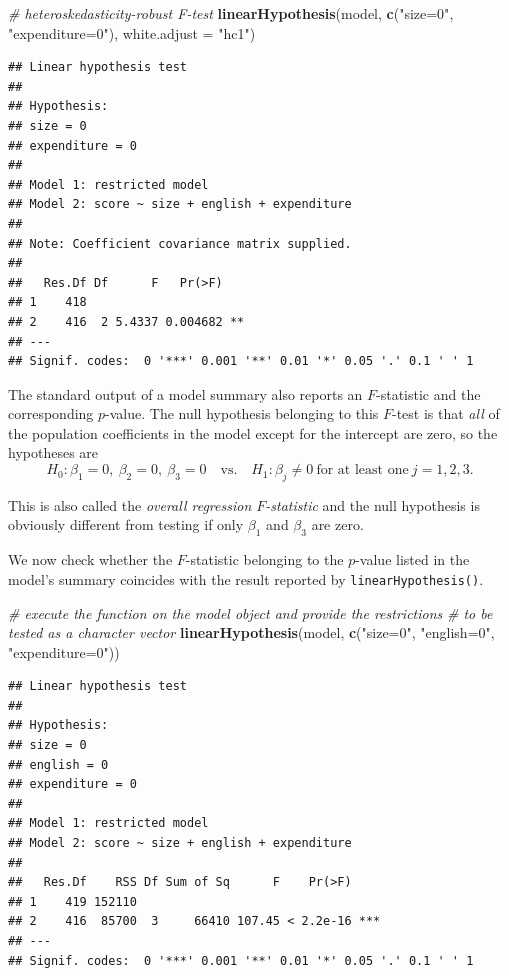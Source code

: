 \documentclass[]{book}
\newenvironment{Shaded}{\begin{snugshade}}{\end{snugshade}}
\newcommand{\KeywordTok}[1]{\textcolor[rgb]{0.13,0.29,0.53}{\textbf{#1}}}
\newcommand{\DataTypeTok}[1]{\textcolor[rgb]{0.13,0.29,0.53}{#1}}
\newcommand{\StringTok}[1]{\textcolor[rgb]{0.31,0.60,0.02}{#1}}
\newcommand{\CommentTok}[1]{\textcolor[rgb]{0.56,0.35,0.01}{\textit{#1}}}
\newcommand{\NormalTok}[1]{#1}
\theoremstyle{definition}
\theoremstyle{definition}
\theoremstyle{definition}
\theoremstyle{remark}
\begin{document}
\begin{Shaded}
\begin{Highlighting}[]
\CommentTok{# heteroskedasticity-robust F-test}
\KeywordTok{linearHypothesis}\NormalTok{(model, }\KeywordTok{c}\NormalTok{(}\StringTok{"size=0"}\NormalTok{, }\StringTok{"expenditure=0"}\NormalTok{), }\DataTypeTok{white.adjust =} \StringTok{"hc1"}\NormalTok{)}
\end{Highlighting}
\end{Shaded}

\begin{verbatim}
## Linear hypothesis test
## 
## Hypothesis:
## size = 0
## expenditure = 0
## 
## Model 1: restricted model
## Model 2: score ~ size + english + expenditure
## 
## Note: Coefficient covariance matrix supplied.
## 
##   Res.Df Df      F   Pr(>F)   
## 1    418                      
## 2    416  2 5.4337 0.004682 **
## ---
## Signif. codes:  0 '***' 0.001 '**' 0.01 '*' 0.05 '.' 0.1 ' ' 1
\end{verbatim}

The standard output of a model summary also reports an \(F\)-statistic
and the corresponding \(p\)-value. The null hypothesis belonging to this
\(F\)-test is that \emph{all} of the population coefficients in the
model except for the intercept are zero, so the hypotheses are
\[H_0: \beta_1=0, \ \beta_2 =0, \ \beta_3 =0 \quad \text{vs.} \quad H_1: \beta_j \neq 0 \ \text{for at least one} \ j=1,2,3.\]

This is also called the \emph{overall regression \(F\)-statistic} and
the null hypothesis is obviously different from testing if only
\(\beta_1\) and \(\beta_3\) are zero.

We now check whether the \(F\)-statistic belonging to the \(p\)-value
listed in the model's summary coincides with the result reported by
\texttt{linearHypothesis()}.

\begin{Shaded}
\begin{Highlighting}[]
\CommentTok{# execute the function on the model object and provide the restrictions }
\CommentTok{# to be tested as a character vector}
\KeywordTok{linearHypothesis}\NormalTok{(model, }\KeywordTok{c}\NormalTok{(}\StringTok{"size=0"}\NormalTok{, }\StringTok{"english=0"}\NormalTok{, }\StringTok{"expenditure=0"}\NormalTok{))}
\end{Highlighting}
\end{Shaded}

\begin{verbatim}
## Linear hypothesis test
## 
## Hypothesis:
## size = 0
## english = 0
## expenditure = 0
## 
## Model 1: restricted model
## Model 2: score ~ size + english + expenditure
## 
##   Res.Df    RSS Df Sum of Sq      F    Pr(>F)    
## 1    419 152110                                  
## 2    416  85700  3     66410 107.45 < 2.2e-16 ***
## ---
## Signif. codes:  0 '***' 0.001 '**' 0.01 '*' 0.05 '.' 0.1 ' ' 1
\end{verbatim}
\end{document}
